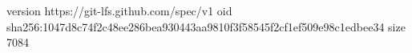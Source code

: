 version https://git-lfs.github.com/spec/v1
oid sha256:1047d8c74f2c48ee286bea930443aa9810f3f58545f2cf1ef509e98c1edbee34
size 7084
